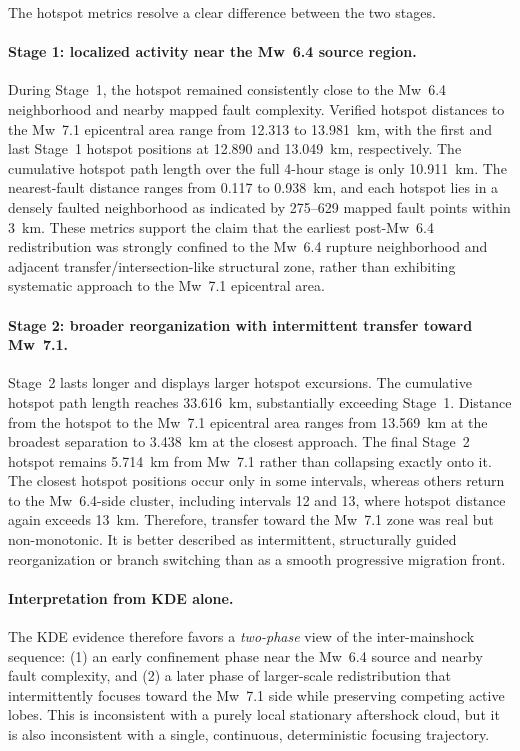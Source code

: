 \documentclass[11pt]{article}
\begin{document}
The hotspot metrics resolve a clear difference between the two stages.

\paragraph{Stage 1: localized activity near the Mw~6.4 source region.}
During Stage~1, the hotspot remained consistently close to the Mw~6.4 neighborhood and nearby mapped fault complexity. Verified hotspot distances to the Mw~7.1 epicentral area range from 12.313 to 13.981~km, with the first and last Stage~1 hotspot positions at 12.890 and 13.049~km, respectively. The cumulative hotspot path length over the full 4-hour stage is only 10.911~km. The nearest-fault distance ranges from 0.117 to 0.938~km, and each hotspot lies in a densely faulted neighborhood as indicated by 275--629 mapped fault points within 3~km. These metrics support the claim that the earliest post-Mw~6.4 redistribution was strongly confined to the Mw~6.4 rupture neighborhood and adjacent transfer/intersection-like structural zone, rather than exhibiting systematic approach to the Mw~7.1 epicentral area.

\paragraph{Stage 2: broader reorganization with intermittent transfer toward Mw~7.1.}
Stage~2 lasts longer and displays larger hotspot excursions. The cumulative hotspot path length reaches 33.616~km, substantially exceeding Stage~1. Distance from the hotspot to the Mw~7.1 epicentral area ranges from 13.569~km at the broadest separation to 3.438~km at the closest approach. The final Stage~2 hotspot remains 5.714~km from Mw~7.1 rather than collapsing exactly onto it. The closest hotspot positions occur only in some intervals, whereas others return to the Mw~6.4-side cluster, including intervals 12 and 13, where hotspot distance again exceeds 13~km. Therefore, transfer toward the Mw~7.1 zone was real but non-monotonic. It is better described as intermittent, structurally guided reorganization or branch switching than as a smooth progressive migration front.

\paragraph{Interpretation from KDE alone.}
The KDE evidence therefore favors a \emph{two-phase} view of the inter-mainshock sequence: (1) an early confinement phase near the Mw~6.4 source and nearby fault complexity, and (2) a later phase of larger-scale redistribution that intermittently focuses toward the Mw~7.1 side while preserving competing active lobes. This is inconsistent with a purely local stationary aftershock cloud, but it is also inconsistent with a single, continuous, deterministic focusing trajectory.
\end{document}
